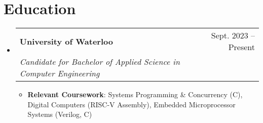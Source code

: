 \documentclass[letterpaper,11pt]{article}
\makeatletter
\newcommand{\resumeItem}[1]{
  \item\small{
    {#1 \vspace{-1.14pt}}
  }
}
\newcommand{\resumeSubheading}[4]{
  \vspace{-2pt}\item
    \begin{tabular*}{0.97\textwidth}[t]{l@{\extracolsep{\fill}}r}
      \textbf{#1} & #2 \\
      \vspace{0.25pt}
      \textit{\small#3} & \textit{\small #4} \\
    \end{tabular*}\vspace{-7pt}
}
\newcommand{\resumeProjectHeading}[2]{
    \item
    \begin{tabular*}{0.97\textwidth}{l@{\extracolsep{\fill}}r}
      \small#1 & #2 \\
    \end{tabular*}\vspace{-7pt}
}
\newcommand{\resumeSubHeadingListStart}{\begin{itemize}[leftmargin=0.15in, label={}]}
\newcommand{\resumeSubHeadingListEnd}{\end{itemize}}
\newcommand{\resumeItemListStart}{\begin{itemize}}
\newcommand{\resumeItemListEnd}{\end{itemize}\vspace{-5pt}}
\makeatother
\begin{document}
          



\section{Education}
  \resumeSubHeadingListStart
    \resumeSubheading
      {University of Waterloo}{Sept. 2023 -- Present}
      {Candidate for Bachelor of Applied Science in Computer Engineering}{}
      \resumeItemListStart
        \resumeItem{\textbf{Relevant Coursework}: Systems Programming \& Concurrency (C), Digital Computers (RISC-V Assembly), Embedded Microprocessor Systems (Verilog, C) }
      \resumeItemListEnd
  \resumeSubHeadingListEnd
  \vspace{-25pt}
\end{document}
